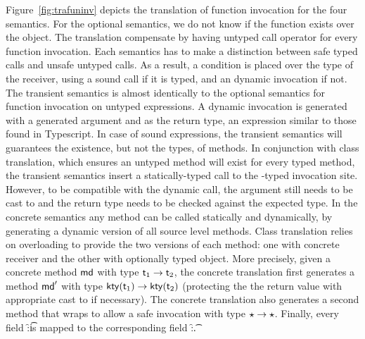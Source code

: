 \documentclass[a4paper,USenglish]{tex/lipics-v2016}
\begin{document}
Figure~\ref{fig:trafuninv} depicts the translation of function invocation
for the four semantics. For the optional semantics, we do not know if the
function exists over the object. The translation compensate by having
untyped call operator for every function invocation.  Each semantics has to
make a distinction between safe typed calls and unsafe untyped calls. As a
result, a condition is placed over the type of the receiver, using a sound
call if it is typed, and an dynamic invocation if not.  The transient
semantics is almost identically to the optional semantics for function
invocation on untyped expressions.  A dynamic invocation is generated with a
generated argument and \any as the return type, an expression similar to
those found in Typescript.  In case of sound expressions, the transient
semantics will guarantees the existence, but not the types, of methods. In
conjunction with class translation, which ensures an untyped method will
exist for every typed method, the transient semantics insert a
statically-typed call to the \any-typed invocation site. However, to be
compatible with the dynamic call, the argument still needs to be cast to
\any and the return type needs to be checked against the expected type.
In the concrete semantics any method can be called statically and
dynamically, by generating a dynamic version of all source level methods.
Class translation relies on overloading to provide the two versions of each
method: one with concrete receiver and the other with optionally typed
object.  More precisely, given a concrete method \(\md\) with type \(\t[1]
\to \t[2]\), the concrete translation first generates a method \(\mdp\) with
type \(\kty{\t[1]} \to \kty{\t[2]}\) (protecting the the return value with
appropriate cast to \kty{\t[2]} if necessary).  The concrete translation
also generates a second method \mdpp that wraps \mdp to allow a safe
invocation with type \(\star \to \star\).  Finally, every field \f:\t is
mapped to the corresponding field \f:\kty\t.
\end{document}
